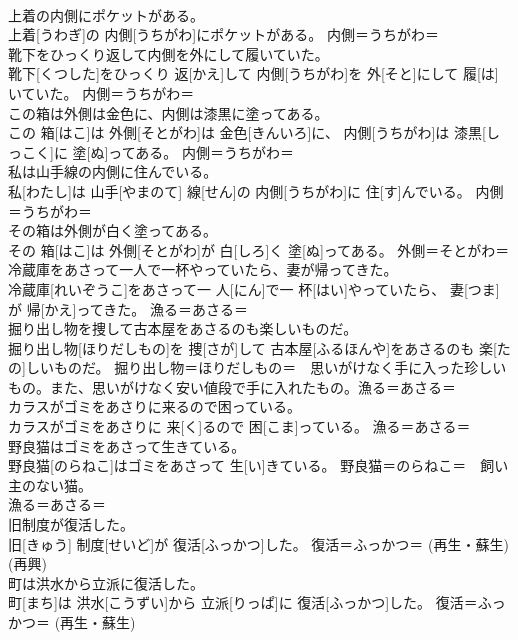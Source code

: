 \documentclass[8pt]{extreport}
\begin{document}
\begin{CJK}{UTF8}{min}
{\\	上着の内側にポケットがある。	
\\	上着[うわぎ]の 内側[うちがわ]にポケットがある。	内側＝うちがわ＝ 
\\	靴下をひっくり返して内側を外にして履いていた。	
\\	靴下[くつした]をひっくり 返[かえ]して 内側[うちがわ]を 外[そと]にして 履[は]いていた。	内側＝うちがわ＝ 
\\	この箱は外側は金色に、内側は漆黒に塗ってある。	
\\	この 箱[はこ]は 外側[そとがわ]は 金色[きんいろ]に、 内側[うちがわ]は 漆黒[しっこく]に 塗[ぬ]ってある。	内側＝うちがわ＝ 
\\	私は山手線の内側に住んでいる。	
\\	私[わたし]は 山手[やまのて] 線[せん]の 内側[うちがわ]に 住[す]んでいる。	内側＝うちがわ＝ 
\\	その箱は外側が白く塗ってある。	
\\	その 箱[はこ]は 外側[そとがわ]が 白[しろ]く 塗[ぬ]ってある。	外側＝そとがわ＝ 
\\	冷蔵庫をあさって一人で一杯やっていたら、妻が帰ってきた。	
\\	冷蔵庫[れいぞうこ]をあさって一 人[にん]で一 杯[はい]やっていたら、 妻[つま]が 帰[かえ]ってきた。	漁る＝あさる＝ 
\\	掘り出し物を捜して古本屋をあさるのも楽しいものだ。	
\\	掘り出し物[ほりだしもの]を 捜[さが]して 古本屋[ふるほんや]をあさるのも 楽[たの]しいものだ。	掘り出し物＝ほりだしもの＝　思いがけなく手に入った珍しいもの。また、思いがけなく安い値段で手に入れたもの。漁る＝あさる＝ 
\\	カラスがゴミをあさりに来るので困っている。	
\\	カラスがゴミをあさりに 来[く]るので 困[こま]っている。	漁る＝あさる＝ 
\\	野良猫はゴミをあさって生きている。	
\\	野良猫[のらねこ]はゴミをあさって 生[い]きている。	野良猫＝のらねこ＝　飼い主のない猫。 
\\	漁る＝あさる＝ 
\\	旧制度が復活した。	
\\	旧[きゅう] 制度[せいど]が 復活[ふっかつ]した。	復活＝ふっかつ＝ (再生・蘇生) 
\\	(再興) 
\\	町は洪水から立派に復活した。	
\\	町[まち]は 洪水[こうずい]から 立派[りっぱ]に 復活[ふっかつ]した。	復活＝ふっかつ＝ (再生・蘇生) 
}
\end{CJK}
\end{document}
